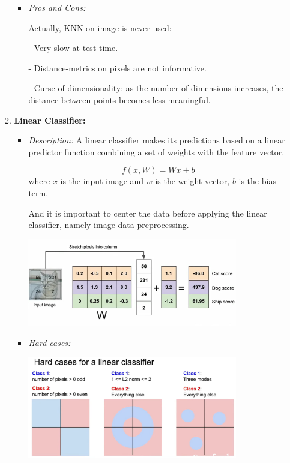 \documentclass{article}
\numberwithin{equation}{section}
\begin{document}
\begin{CJK}{UTF8}{gbsn}
\begin{enumerate}
\begin{enumerate}
\begin{itemize}
            \item \textit{Pros and Cons:}\par
            Actually, KNN on image is never used:\par
            - Very slow at test time.\par
            - Distance-metrics on pixels are not informative.\par
            - Curse of dimensionality: as the number of dimensions increases, the distance between points becomes less meaningful.\par
        \end{itemize}

        \item \textbf{Linear Classifier:}
        \begin{itemize}
            \item \textit{Description:} A linear classifier makes its predictions based on a linear predictor function combining a set of weights with the feature vector.\par
            \begin{equation}
                f(x, W) = Wx + b
            \end{equation}
            where \(x\) is the input image and \(w\) is the weight vector, \(b\) is the bias term.\par
            And it is important to center the data before applying the linear classifier, namely image data preprocessing.\par
            \includegraphics[width=0.8\textwidth]{images/Lecture2/linear_classifier_example.png}
            \item \textit{Hard cases:}\par
            \includegraphics[width=0.8\textwidth]{images/Lecture2/hard_cases_for_linear_classifier.png}
        \end{itemize}
    \end{enumerate}
\end{enumerate}




\end{CJK}
\end{document}
